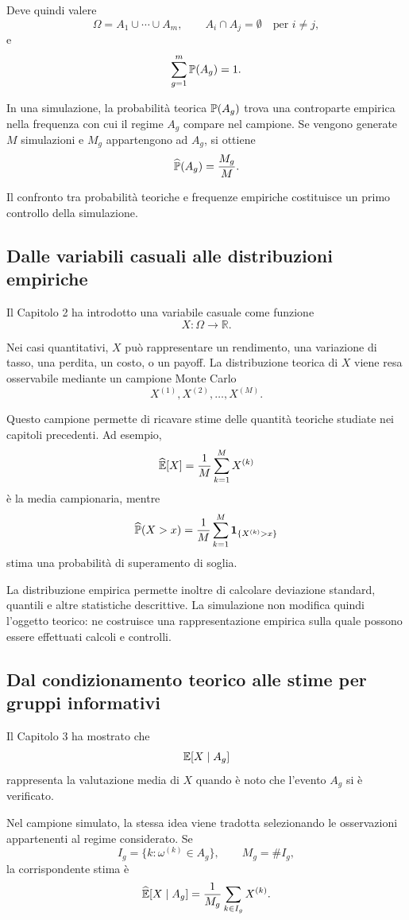 Deve quindi valere
\[
\Omega=A_{1}\cup\cdots\cup A_{m},
\qquad
A_{i}\cap A_{j}=\emptyset
\quad\text{per }i\neq j,
\]
e
\[
\sum_{g=1}^{m}\mathbb{P}(A_{g})=1.
\]

In una simulazione, la probabilit\`{a} teorica $\mathbb{P}(A_g)$ trova una
controparte empirica nella frequenza con cui il regime $A_g$ compare nel
campione. Se vengono generate $M$ simulazioni e $M_g$ appartengono ad $A_g$,
si ottiene
\[
\widehat{\mathbb{P}}(A_g)
=
\frac{M_g}{M}.
\]

Il confronto tra probabilit\`{a} teoriche e frequenze empiriche costituisce un
primo controllo della simulazione.

\subsection{Dalle variabili casuali alle distribuzioni empiriche}

Il Capitolo 2 ha introdotto una variabile casuale come funzione
\[
X:\Omega\longrightarrow\mathbb{R}.
\]

Nei casi quantitativi, $X$ pu\`{o} rappresentare un rendimento, una variazione
di tasso, una perdita, un costo, o un payoff. La distribuzione teorica di $X$
viene resa osservabile mediante un campione Monte Carlo
\[
X^{(1)},X^{(2)},\ldots,X^{(M)}.
\]

Questo campione permette di ricavare stime delle quantit\`{a} teoriche
studiate nei capitoli precedenti. Ad esempio,
\[
\widehat{\mathbb{E}}[X]
=
\frac{1}{M}\sum_{k=1}^{M}X^{(k)}
\]
\`{e} la media campionaria, mentre
\[
\widehat{\mathbb{P}}(X>x)
=
\frac{1}{M}
\sum_{k=1}^{M}
\mathbf{1}_{\{X^{(k)}>x\}}
\]
stima una probabilit\`{a} di superamento di soglia.

La distribuzione empirica permette inoltre di calcolare deviazione standard,
quantili e altre statistiche descrittive. La simulazione non modifica quindi
l'oggetto teorico: ne costruisce una rappresentazione empirica sulla quale
possono essere effettuati calcoli e controlli.

\subsection{Dal condizionamento teorico alle stime per gruppi informativi}

Il Capitolo 3 ha mostrato che
\[
\mathbb{E}[X\mid A_g]
\]
rappresenta la valutazione media di $X$ quando \`{e} noto che l'evento $A_g$
si \`{e} verificato.

Nel campione simulato, la stessa idea viene tradotta selezionando le osservazioni
appartenenti al regime considerato. Se
\[
I_g=\{k:\omega^{(k)}\in A_g\},
\qquad
M_g=\# I_g,
\]
la corrispondente stima \`{e}
\[
\widehat{\mathbb{E}}[X\mid A_g]
=
\frac{1}{M_g}
\sum_{k\in I_g}X^{(k)}.
\]

